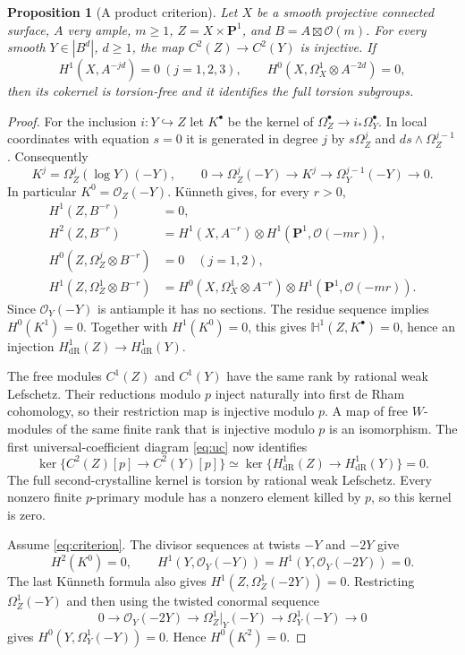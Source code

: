 \documentclass[11pt,a4paper]{article}
\newcommand{\OO}{\mathcal O}
\newcommand{\PP}{\mathbf P}
\newcommand{\dR}{\mathrm{dR}}
\newcommand{\HH}{\mathbb H}
\newtheorem{proposition}[theorem]{Proposition}
\theoremstyle{definition}\newtheorem{definition}[theorem]{Definition}
\theoremstyle{remark}\newtheorem{remark}[theorem]{Remark}
\numberwithin{equation}{section}
\begin{document}
\begin{proposition}[A product criterion]\label{prop:criterion}
Let $X$ be a smooth projective connected surface, $A$ very ample, $m\ge1$, $Z=X\times\PP^1$, and $B=A\boxtimes\OO(m)$. For every smooth $Y\in|B^d|$, $d\ge1$, the map $C^2(Z)\to C^2(Y)$ is injective. If
\begin{equation}\label{eq:criterion}
 H^1(X,A^{-jd})=0\ (j=1,2,3),\qquad
 H^0(X,\Omega_X^1\otimes A^{-2d})=0,
\end{equation}
then its cokernel is torsion-free and it identifies the full torsion subgroups.
\end{proposition}
\begin{proof}
For the inclusion $i:Y\hookrightarrow Z$ let $K^\bullet$ be the kernel of $\Omega_Z^\bullet\to i_*\Omega_Y^\bullet$. In local coordinates with equation $s=0$ it is generated in degree $j$ by $s\Omega_Z^j$ and $ds\wedge\Omega_Z^{j-1}$. Consequently
\[
 K^j=\Omega_Z^j(\log Y)(-Y),\qquad
 0\to\Omega_Z^j(-Y)\to K^j\to\Omega_Y^{j-1}(-Y)\to0.
\]
In particular $K^0=\OO_Z(-Y)$. Künneth gives, for every $r>0$,
\begin{align*}
 H^1(Z,B^{-r})&=0,\\
 H^2(Z,B^{-r})&=H^1(X,A^{-r})\otimes H^1(\PP^1,\OO(-mr)),\\
 H^0(Z,\Omega_Z^j\otimes B^{-r})&=0\quad(j=1,2),\\
 H^1(Z,\Omega_Z^1\otimes B^{-r})
 &=H^0(X,\Omega_X^1\otimes A^{-r})\otimes H^1(\PP^1,\OO(-mr)).
\end{align*}
Since $\OO_Y(-Y)$ is antiample it has no sections. The residue sequence implies $H^0(K^1)=0$. Together with $H^1(K^0)=0$, this gives $\HH^1(Z,K^\bullet)=0$, hence an injection $H^1_{\dR}(Z)\to H^1_{\dR}(Y)$.

The free modules $C^1(Z)$ and $C^1(Y)$ have the same rank by rational weak Lefschetz. Their reductions modulo $p$ inject naturally into first de Rham cohomology, so their restriction map is injective modulo $p$. A map of free $W$-modules of the same finite rank that is injective modulo $p$ is an isomorphism. The first universal-coefficient diagram \eqref{eq:uc} now identifies
\[
 \ker\{C^2(Z)[p]\to C^2(Y)[p]\}
       \simeq\ker\{H^1_{\dR}(Z)\to H^1_{\dR}(Y)\}=0.
\]
The full second-crystalline kernel is torsion by rational weak Lefschetz. Every nonzero finite $p$-primary module has a nonzero element killed by $p$, so this kernel is zero.

Assume \eqref{eq:criterion}. The divisor sequences at twists $-Y$ and $-2Y$ give
\[
 H^2(K^0)=0,\qquad
 H^1(Y,\OO_Y(-Y))=H^1(Y,\OO_Y(-2Y))=0.
\]
The last Künneth formula also gives $H^1(Z,\Omega_Z^1(-2Y))=0$. Restricting $\Omega_Z^1(-Y)$ and then using the twisted conormal sequence
\[
 0\to\OO_Y(-2Y)\to\Omega_Z^1|_Y(-Y)\to\Omega_Y^1(-Y)\to0
\]
gives $H^0(Y,\Omega_Y^1(-Y))=0$. Hence $H^0(K^2)=0$.


\end{proof}
\end{document}
